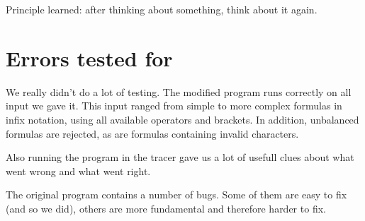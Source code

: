 \documentclass[11pt]{article}
\begin{document}
Principle learned: after thinking about something, think about it again.


\section{Errors tested for}

We really didn't do a lot of testing. The modified program runs correctly on all input we gave it. This input ranged from simple to more complex formulas in infix notation, using all available operators and brackets. In addition, unbalanced formulas are rejected, as are formulas containing invalid characters.

Also running the program in the tracer gave us a lot of usefull clues about what went wrong and what went right.

The original program contains a number of bugs. Some of them are easy to fix (and so we did), others are more fundamental and therefore harder to fix.
\end{document}
